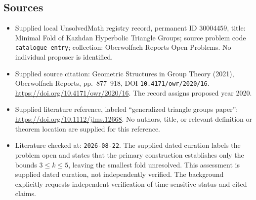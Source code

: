 \documentclass[11pt]{article}
\begin{document}
\subsection{Sources}
\begin{itemize}
\item Supplied local UnsolvedMath registry record, permanent ID \(30004459\), title: Minimal Fold of Kazhdan Hyperbolic Triangle Groups; source problem code \texttt{catalogue entry}; collection: Oberwolfach Reports Open Problems. No individual proposer is identified.
\item Supplied source citation: Geometric Structures in Group Theory (2021), Oberwolfach Reports, pp.\ 877--918, DOI \texttt{10.4171/owr/2020/16}. \url{https://doi.org/10.4171/owr/2020/16}. The record assigns proposed year 2020.
\item Supplied literature reference, labeled ``generalized triangle groups paper'': \url{https://doi.org/10.1112/jlms.12668}. No authors, title, or relevant definition or theorem location are supplied for this reference.
\item Literature checked at: \texttt{2026-08-22}. The supplied dated curation labels the problem open and states that the primary construction establishes only the bounds \(3\leq k\leq5\), leaving the smallest fold unresolved. This assessment is supplied dated curation, not independently verified. The background explicitly requests independent verification of time-sensitive status and cited claims.
\end{itemize}
\end{document}
